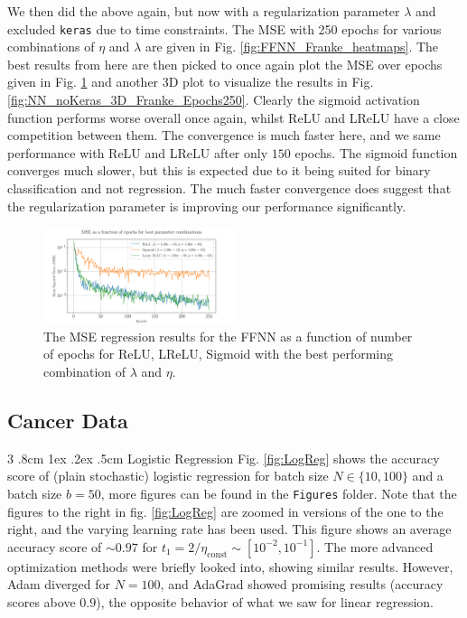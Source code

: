 \documentclass[%
reprint,s
amsmath,amssymb,
aps,
]{revtex4-2}
\makeatletter
\renewcommand{\subsubsection}{%
	\@startsection
	{subsubsection}%
	{3}%
	{\z@}%
	{.8cm \@plus1ex \@minus .2ex}%
	{.5cm}%
	{\normalfont\small\centering}%
}
\makeatother
\begin{document}
We then did the above again, but now with a regularization parameter $\lambda$ and excluded \texttt{keras} due to time constraints. The MSE with 250 epochs for various combinations of $\eta$ and $\lambda$ are given in Fig. \ref{fig:FFNN_Franke_heatmaps}. The best results from here are then picked to once again plot the MSE over epochs given in Fig. \ref{fig:best_MSE_Franke_Epochs} and another 3D plot to visualize the results in Fig. \ref{fig:NN_noKeras_3D_Franke_Epochs250}. Clearly the sigmoid activation function performs worse overall once again, whilst ReLU and LReLU have a close competition between them. The convergence is much faster here, and we same performance with ReLU and LReLU after only $150$ epochs. The sigmoid function converges much slower, but this is expected due to it being suited for binary classification and not regression. The much faster convergence does suggest that the regularization parameter is improving our performance significantly.
\begin{figure}[ht!]
	\includegraphics[width=0.5\textwidth]{Figures/Best_MSE_vs_Epochs250.pdf}
	\caption{The MSE regression results for the FFNN as a function of number of epochs for ReLU, LReLU, Sigmoid with the best performing combination of $\lambda$ and $\eta$.}
	\label{fig:best_MSE_Franke_Epochs}
\end{figure}

\subsection{Cancer Data}
\subsubsection{Logistic Regression} \label{sec:cancer_data_logisit_regression}
Fig. \ref{fig:LogReg} shows the accuracy score of (plain stochastic) logistic regression for batch size \(N\in\{10, 100\}\) and a batch size \(b=50\), more figures can be found in the \texttt{Figures} folder. Note that the figures to the right in fig. \ref{fig:LogReg} are zoomed in versions of the one to the right, and the varying learning rate has been used. This figure shows an average accuracy score of \(\sim 0.97\) for \(t_1 = 2/\eta_{\text{const}} \sim[10^{-2}, 10^{-1}]\). The more advanced optimization methods were briefly looked into, showing similar results. However, Adam diverged for \(N=100\), and AdaGrad showed promising results (accuracy scores above \(0.9\)), the opposite behavior of what we saw for linear regression.
\end{document}
